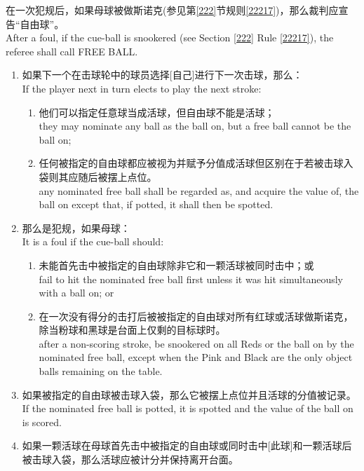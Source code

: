 \noindent 在一次犯规后，如果母球被做斯诺克(参见第\ref{222}节规则\ref{22217})，那么裁判应宣告``自由球''。\\
After a foul, if the cue-ball is snookered (see Section \ref{222} Rule \ref{22217}), the referee shall call FREE BALL.
\begin{enumerate}[label=(\alph*)]
    \item 如果下一个在击球轮中的球员选择[自己]进行下一次击球，那么：\\
    If the player next in turn elects to play the next stroke:
    \begin{enumerate}[label=(\roman*)]
        \item 他们可以指定任意球当成活球，但自由球不能是活球；\\
        they may nominate any ball as the ball on, but a free ball cannot be the ball on;
        \item 任何被指定的自由球都应被视为并赋予分值成活球但区别在于若被击球入袋则其应随后被摆上点位。\\
        any nominated free ball shall be regarded as, and acquire the value of, the ball on except that, if potted, it shall then be spotted.
    \end{enumerate}
    \item \label{22312b}那么是犯规，如果母球：\\
    It is a foul if the cue-ball should:
    \begin{enumerate}[label=(\roman*)]
        \item 未能首先击中被指定的自由球除非它和一颗活球被同时击中；或\\
        fail to hit the nominated free ball first unless it was hit simultaneously with a ball on; or
        \item \label{22312bii}在一次没有得分的击打后被被指定的自由球对所有红球或活球做斯诺克，除当粉球和黑球是台面上仅剩的目标球时。\\
        after a non-scoring stroke, be snookered on all Reds or the ball on by the nominated free ball, except when the Pink and Black are the only object balls remaining on the table.
    \end{enumerate}
    \item 如果被指定的自由球被击球入袋，那么它被摆上点位并且活球的分值被记录。\\
    If the nominated free ball is potted, it is spotted and the value of the ball on is scored.
    \item 如果一颗活球在母球首先击中被指定的自由球或同时击中[此球]和一颗活球后被击球入袋，那么活球应被计分并保持离开台面。\\

\end{enumerate}
